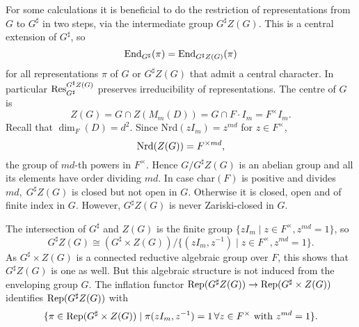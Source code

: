 \documentclass[11pt]{amsart}
\theoremstyle{definition}
\begin{document}
For some calculations it is beneficial to do the restriction of representations from $G$
to $G^\sharp$ in two steps, via the intermediate group $G^\sharp Z(G)$. This is a central
extension of $G^\sharp$, so
\begin{equation}\label{eq:2.8}
{{\rm End}}_{G^\sharp}(\pi) = {{\rm End}}_{G^\sharp Z(G)}(\pi) 
\end{equation}
for all representations $\pi$ of $G$ or $G^\sharp Z(G)$ that admit a central character.
In particular ${{\rm Res}}_{G^\sharp}^{G^\sharp Z(G)}$ preserves irreducibility of representations.
The centre of $G$ is \label{i:86}
\begin{equation}\label{eq:2.27}
Z(G) = G \cap Z(M_m (D)) = G \cap F \cdot I_m = F^\times I_m .
\end{equation}
Recall that $\dim_F (D) = d^2$. Since Nrd$(z I_m) = z^{md}$ for $z \in F^\times$, 
\[
{{\rm Nrd}} (Z(G)) = F^{\times md},
\]
the group of $md$-th powers in $F^\times$. Hence $G / G^\sharp Z(G)$ is an abelian 
group and all its elements have order dividing $md$. In case char$(F)$ is positive and 
divides $md ,\; G^\sharp Z(G)$ is closed but not open in $G$. Otherwise it is closed, 
open and of finite index in $G$. However, $G^\sharp Z(G)$ is never Zariski-closed in $G$.

The intersection of $G^\sharp$ and $Z(G)$ is the finite group 
$\{ z I_m \mid z \in F^\times, z^{md} = 1 \}$, so
\begin{equation}
G^\sharp Z(G) \cong 
(G^\sharp \times Z(G)) / \{ (z I_m, z^{-1}) \mid z \in F^\times, z^{md} = 1 \}.
\end{equation}
As $G^\sharp \times Z(G)$ is a connected reductive algebraic group over $F$, this shows 
that $G^\sharp Z(G)$ is one as well. But this algebraic structure is not induced from the
enveloping group $G$.
The inflation functor ${{\rm Rep}} (G^\sharp Z(G)) \to {{\rm Rep}} (G^\sharp \times Z(G))$ identifies
${{\rm Rep}} (G^\sharp Z(G))$ with
\[
\{ \pi \in {{\rm Rep}} (G^\sharp \times Z(G)) \mid \pi (z I_m, z^{-1}) = 1 \, \forall
z \in F^\times \text{ with } z^{md} = 1 \} .
\]
\end{document}
